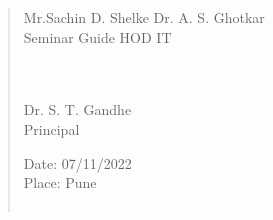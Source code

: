 \documentclass[12pt,a4paper]{report}     %
\begin{document}
\begin{quote}
\singlespace
{Mr.Sachin D. Shelke} %
\hspace{2.8in} Dr. A. S. Ghotkar\\
Seminar Guide\hspace{3.5 in}       HOD IT \\\\\\
\begin{center}  Dr. S. T. Gandhe   \\
  Principal 
 \end{center}


Date: 07/11/2022      \\ %
Place: Pune      %
\\\\


 \end{quote}
\end{document}

